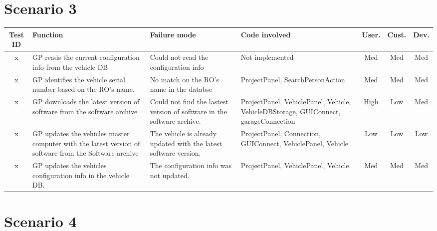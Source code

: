 \begin{landscape}
\begin{longtable}{ c | p{5cm} | p{5cm} | p{5cm} | c | c | c}
		\end{longtable}

	\section{Scenario 3}

		\begin{table}[H]
			\begin{tabular}{ c | p{5cm} | p{5cm} | p{5cm} | c | c | c}
				\hline
				{\bf Test ID} & {\bf Function} & {\bf Failure mode} & {\bf Code involved} & 
				{\bf User.} & {\bf Cust.} & {\bf Dev.} \\ \hline
				x 
				& GP reads the current configuration info from the vehicle  DB 
				& Could not read the configuration info 
				& Not implemented 
				& Med & Med & Med \\ \hline
				x 
				& GP identifies the vehicle serial number
				based on the RO's name.  
				& No match on the RO's name in the databse
				& ProjectPanel, SearchPersonAction 
				& Med & Med & Med \\ \hline
				x 
				& GP downloads the latest version of software
				from the software archive 
				& Could not find the lastest version of software
				in the software archive.
				& ProjectPanel, VehiclePanel, Vehicle, VehicleDBStorage, GUIConnect, garageConnection
				& High & Low & Med \\ \hline
				x 
				& GP updates the vehicles master computer with
				the latest version of software from the Software
				archive 
				& The vehicle is already updated with the latest
				software version.
				& ProjectPanel, Connection, GUIConnect, 
				VehiclePanel, Vehicle
				& Low & Low & Low \\ \hline
				x 
				& GP updates the vehicles configuration info 
				in the vehicle DB. 
				& The configuration info was not updated.
				& ProjectPanel, VehiclePanel, 
				Vehicle
				& Med & Med & Med \\ \hline
			\end{tabular}
		\end{table}


	\section{Scenario 4}


\end{landscape}
